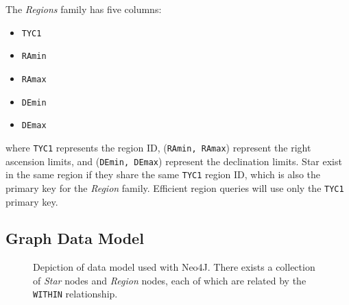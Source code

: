 The \textit{Regions} family has five columns:
\begin{multicols}{3}
    \noindent
    \begin{itemize}
        \item[] \texttt{TYC1}
        \item[] \texttt{RAmin}
        \item[] \texttt{RAmax}
        \item[] \texttt{DEmin}
        \item[] \texttt{DEmax}
    \end{itemize}
\end{multicols}
where \texttt{TYC1} represents the region ID, (\texttt{RAmin, RAmax}) represent the right ascension limits, and
(\texttt{DEmin, DEmax}) represent the declination limits.
Star exist in the same region if they share the same \texttt{TYC1} region ID\@, which is also the primary key for
the \textit{Region} family.
Efficient region queries will use only the \texttt{TYC1} primary key.


\subsection{Graph Data Model}\label{subsec:graphDataModel}
\begin{figure}
    \caption{Depiction of data model used with Neo4J.
    There exists a collection of \textit{Star} nodes and \textit{Region} nodes, each of which are related by the
    \texttt{WITHIN} relationship.}
\end{figure}

